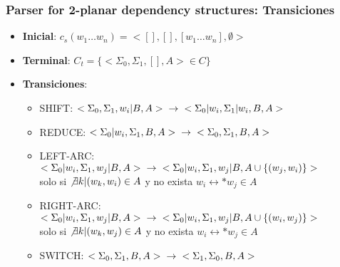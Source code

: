 \documentclass[spanish]{beamer}
\begin{document}
\begin{frame}
\frametitle{Parser for 2-planar dependency structures: Transiciones}
\begin{itemize}
\item \textbf{Inicial}: $c_s(w_1\dots w_n) = <[],[],[w_1\dots w_n],\emptyset>$
\item \textbf{Terminal}: $C_t = \{<\Sigma_0,\Sigma_1,[],A>\in C\}$
\item \textbf{Transiciones}:   
    \begin{itemize}
    \item SHIFT:      $<\Sigma_0,\Sigma_1,w_i|B,A> \hspace{0.2cm} \rightarrow \hspace{0.2cm} 
<\Sigma_0|w_i,\Sigma_1|w_i,B,A>$
    \item REDUCE:     $<\Sigma_0|w_i,\Sigma_1,B,A> \hspace{0.2cm} \rightarrow \hspace{0.2cm} 
<\Sigma_0,\Sigma_1,B,A>$ 
    \item LEFT-ARC:   $<\Sigma_0|w_i,\Sigma_1,w_j|B,A> \hspace{0.2cm} \rightarrow \hspace{0.2cm} 
<\Sigma_0|w_i,\Sigma_1,w_j|B,A\cup \{(w_j,w_i)\}>$ \\
solo si $\not\exists k | (w_k,w_i)\in A$ y no exista $w_i \leftrightarrow * w_j\in A$
    \item RIGHT-ARC: $<\Sigma_0|w_i,\Sigma_1,w_j|B,A> \hspace{0.2cm}\rightarrow \hspace{0.2cm} 
<\Sigma_0|w_i,\Sigma_1,w_j|B,A\cup \{(w_i,w_j)\}>$ \\ 
solo si $\not\exists k | (w_k,w_j)\in A$ y no exista $w_i \leftrightarrow * w_j\in A$
    \item SWITCH: $<\Sigma_0,\Sigma_1,B,A> \hspace{0.2cm} \rightarrow \hspace{0.2cm} 
<\Sigma_1,\Sigma_0,B,A>$
    \end{itemize}
\end{itemize}
\end{frame}
\end{document}
